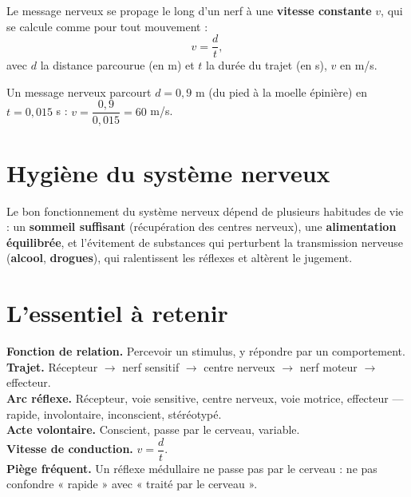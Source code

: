 \begin{propriete}
Le message nerveux se propage le long d'un nerf à une \textbf{vitesse constante} $v$, qui
se calcule comme pour tout mouvement :
\[
v=\frac dt,
\]
avec $d$ la distance parcourue (en m) et $t$ la durée du trajet (en s), $v$ en m/s.
\end{propriete}

\begin{exemple}
Un message nerveux parcourt $d=0{,}9$ m (du pied à la moelle épinière) en $t=0{,}015$ s :
$v=\dfrac{0{,}9}{0{,}015}=60$ m/s.
\end{exemple}

\section{Hygiène du système nerveux}

\begin{propriete}
Le bon fonctionnement du système nerveux dépend de plusieurs habitudes de vie : un
\textbf{sommeil suffisant} (récupération des centres nerveux), une \textbf{alimentation
équilibrée}, et l'évitement de substances qui perturbent la transmission nerveuse
(\textbf{alcool}, \textbf{drogues}), qui ralentissent les réflexes et altèrent le
jugement.
\end{propriete}

\section{L'essentiel à retenir}

\begin{synthese}
\textbf{Fonction de relation.} Percevoir un stimulus, y répondre par un comportement.\\[4pt]
\textbf{Trajet.} Récepteur $\to$ nerf sensitif $\to$ centre nerveux $\to$ nerf moteur
$\to$ effecteur.\\[4pt]
\textbf{Arc réflexe.} Récepteur, voie sensitive, centre nerveux, voie motrice, effecteur —
rapide, involontaire, inconscient, stéréotypé.\\[4pt]
\textbf{Acte volontaire.} Conscient, passe par le cerveau, variable.\\[4pt]
\textbf{Vitesse de conduction.} $v=\dfrac dt$.\\[4pt]
\textbf{Piège fréquent.} Un réflexe médullaire ne passe pas par le cerveau : ne pas
confondre « rapide » avec « traité par le cerveau ».
\end{synthese}

